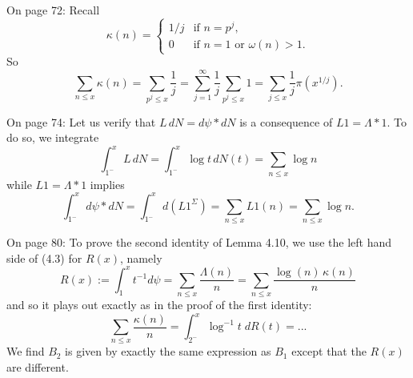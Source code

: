 \documentclass[12pt]{article}
\begin{document}
\fi

On page 72: Recall
$$\kappa(n) = \begin{cases}
1/j &\text{if } n = p^j,\\
0 &\text{if } n = 1 \text{ or } \omega(n) > 1.
\end{cases}$$
So
$$\sum_{n \leq x} \kappa(n) = \sum_{p^j \leq x} \frac{1}{j} = \sum_{j = 1}^{\infty} \frac{1}{j} \sum_{p^j \leq x} 1  = \sum_{j \leq x} \frac{1}{j} \pi(x^{1/j}).$$


On page 74: Let us verify that $L \, dN = d\psi * dN$ is a consequence of $L1 = \Lambda * 1$. To do so, we integrate
$$\int_{1^-}^x L \, dN = \int_{1^-}^x \log t \, dN(t) = \sum_{n \leq x} \log n$$
while $L1 = \Lambda * 1$ implies
$$\int_{1^-}^x d\psi * dN = \int_{1^-}^x d(L1^\Sigma) = \sum_{n \leq x} L1(n) = \sum_{n \leq x} \log n.$$

On page 80: To prove the second identity of Lemma 4.10, we use the left hand side of (4.3) for $R(x)$, namely
$$R(x) := \int_1^x t^{-1} d\psi = \sum_{n \leq x} \frac{\Lambda(n)}{n} = \sum_{n \leq x} \frac{\log(n) \, \kappa(n)}{n}$$
and so it plays out exactly as in the proof of the first identity:
$$\sum_{n \leq x} \frac{\kappa(n)}{n} = \int_{2^-}^x \log^{-1} t \; dR(t) = ...$$
We find $B_2$ is given by exactly the same expression as $B_1$ except that the $R(x)$ are different.

\unless\ifdefined\IsMainDocument
\end{document}
